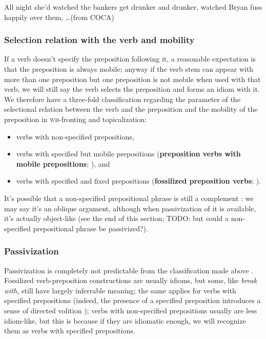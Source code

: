 \documentclass[UTF8, a4paper, oneside, scheme=plain, 12pt]{ctexbook}
\newcommand*{\citepage}[1]{p.~{#1}}
\newcommand*{\concept}[1]{\textbf{#1}}
\newcommand{\form}[1]{\emph{#1}}
\newcommand{\category}[1]{\textsc{#1}}
\begin{document}
\begin{exe}
    \ex All night she'd watched the bankers get drunker and drunker, watched Bryan fuss happily over them, \dots (from COCA)
\end{exe}

\subsubsection{Selection relation with the verb and mobility}

If a verb doesn't specify the preposition following it, 
a reasonable expectation is that the preposition is always mobile; 
anyway if the verb stem can appear with more than one preposition
but one preposition is not mobile when used with that verb, 
we will still say the verb selects the preposition and forms an idiom with it.
We therefore have a three-fold classification
regarding the parameter of the selectional relation between the verb and the preposition
and the mobility of the preposition in \category{wh}-fronting and topicalization:
\begin{itemize}
    \item verbs with non-specified prepositions,
    \item verbs with specified but mobile prepositions 
    (\concept{preposition verbs with mobile prepositions}; \citealp[\citepage{273}]{cgel}), and 
    \item verbs with specified and fixed prepositions 
    (\concept{fossilized preposition verbs}; \citealp[\citepage{277}]{cgel}).
\end{itemize}
It's possible that a non-specified prepositional phrase is still a complement \citep[\citepage{273}]{cgel}:
we may say it's an oblique argument,
although when passivization of it is available,
it's actually object-like (see the end of this section; TODO: but could a non-specified prepositional phrase be passivized?).

\subsubsection{Passivization}\label{sec:clause.preposition.pass}

Passivization is completely not predictable 
from the classification made above \citep[\citepage{276} {[11]}]{cgel}.
Fossilized verb-preposition constructions are usually idioms,
but some, like \form{break with}, 
still have largely inferrable meaning;
the same applies for verbs with specified prepositions
(indeed, the presence of a specified preposition introduces a sense of 
directed volition \citep[\citepage{293}]{dixon2005semantic});
verbs with non-specified prepositions usually are less idiom-like,
but this is because if they are idiomatic enough,
we will recognize them as verbs with specified prepositions.
\end{document}
